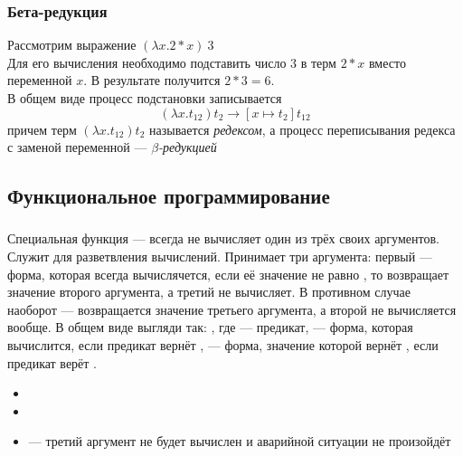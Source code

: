 \documentclass[a4paper, 12pt, titlepage, twoside]{article}
\newenvironment{examples}
               {\begin{itemize}\renewcommand{\labelitemi}{ }}
               {\end{itemize}}
\begin{document}
\subsubsection{Бета-редукция}
Рассмотрим выражение $(\lambda x.2*x)\ 3$\\
Для его вычисления необходимо подставить число $3$ в терм $2 * x$ вместо переменной $x$. В результате получится $2 * 3 = 6$.\\
В общем виде процесс подстановки записывается \[(\lambda x.t_{12}) t_2\longrightarrow [x\mapsto t_2]t_{12}\]
причем терм $(\lambda x.t_{12}) t_2$ называется \textit{редексом}, а процесс переписывания редекса с заменой переменной --- \textit{$\beta$-редукцией}
  
\subsection{Функциональное программирование}


\begin{verb}
\subsubsection{}
Специальная функция --- всегда не вычисляет один из трёх своих аргументов. Служит для разветвления вычислений. Принимает три аргумента: первый --- форма, которая всегда вычислячется, если её значение не равно , то  возвращает значение второго аргумента, а третий не вычисляет. В противном случае наоборот --- возвращается значение третьего аргумента, а второй не вычисляется вообще. В общем виде выгляди так: , где  --- предикат,  --- форма, которая вычислится, если предикат вернёт ,  --- форма, значение которой вернёт , если предикат верёт .
\begin{examples}
  \item {}
  \item {}
  \item {} --- третий аргумент не будет вычислен и аварийной ситуации не произойдёт
\end{examples}
\end{verb}
\end{document}
